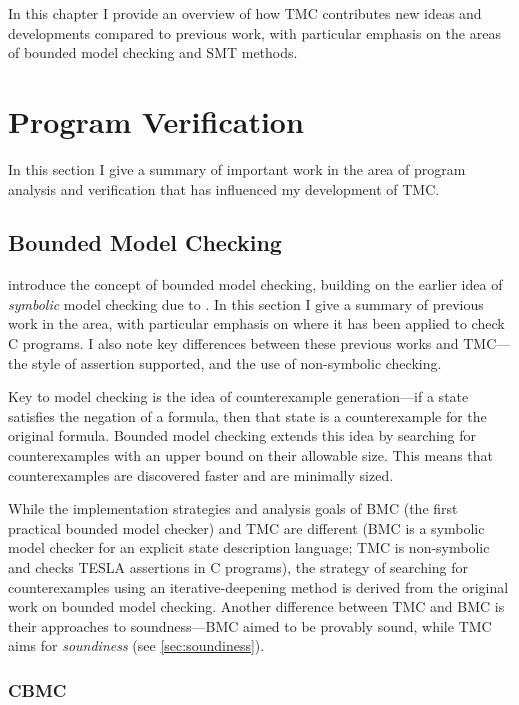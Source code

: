 In this chapter I provide an overview of how TMC contributes new ideas and
developments compared to previous work, with particular emphasis on the
areas of bounded model checking and SMT methods.

\section{Program Verification} \label{sec:bounded-model-checking}

In this section I give a summary of important work in the area of program
analysis and verification that has influenced my development of TMC.

\subsection{Bounded Model Checking}

\textcite{biere_symbolic_1999} introduce the concept of bounded model checking,
building on the earlier idea of \emph{symbolic} model checking due to
\textcite{mcmillan_symbolic_1992}. In this section I give a summary of previous
work in the area, with particular emphasis on where it has been applied to check
C programs. I also note key differences between these previous works and
TMC---the style of assertion supported, and the use of non-symbolic checking.

Key to model checking is the idea of counterexample generation---if a state
satisfies the negation of a formula, then that state is a counterexample for the
original formula. Bounded model checking extends this idea by searching for
counterexamples with an upper bound on their allowable size. This means that
counterexamples are discovered faster and are minimally sized.

While the implementation strategies and analysis goals of BMC
\cite{biere_symbolic_1999} (the first practical bounded model checker) and TMC
are different (BMC is a symbolic model checker for an explicit state description
language; TMC is non-symbolic and checks TESLA assertions in C
programs), the strategy of searching for counterexamples using an
iterative-deepening method is derived from the original work on bounded
model checking. Another difference between TMC and BMC is their approaches to
soundness---BMC aimed to be provably sound, while TMC aims for \emph{soundiness}
\cite{livshits_defense_2015} (see \autoref{sec:soundiness}).

\subsubsection{CBMC}

